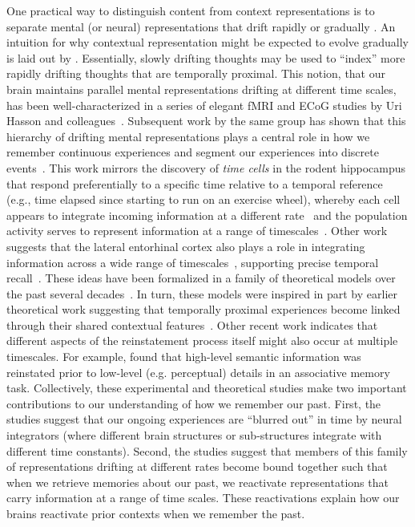 \documentclass{article}
\begin{document}
One practical way to distinguish content from context representations is to separate mental (or neural) representations that drift rapidly \citep[content;][]{PolyEtal05a, MannEtal12} or gradually \citep[context;][]{PolyEtal05a, MannEtal11, HowaEtal12, LohnEtal18, LongKaha18, FolkEtal18}.  An intuition for why contextual representation might be expected to evolve gradually is laid out by \cite{PolyKaha08}.  Essentially, slowly drifting thoughts may be used to ``index'' more rapidly drifting thoughts that are temporally proximal.  This notion, that our brain maintains parallel mental representations drifting at different time scales, has been well-characterized in a series of elegant fMRI and ECoG studies by Uri Hasson and colleagues~\citep{HassEtal08, LernEtal11, HoneEtal12a, AlyEtal18}.  Subsequent work by the same group has shown that this hierarchy of drifting mental representations plays a central role in how we remember continuous experiences and segment our experiences into discrete events~\citep{BaldEtal17}. This work mirrors the discovery of \textit{time cells} in the rodent hippocampus that respond preferentially to a specific time relative to a temporal reference (e.g., time elapsed since starting to run on an exercise wheel), whereby each cell appears to integrate incoming information at a different rate~\citep{PastEtal08, MacDEtal11} and the population activity serves to represent information at a range of timescales~\citep{MauEtal18}. Other work suggests that the lateral entorhinal cortex also plays a role in integrating information across a wide range of timescales~\citep{TsaoEtal18}, supporting precise temporal recall~\citep{MontEtal19}.  These ideas have been formalized in a family of theoretical models over the past several decades~\citep{HowaKaha02a, DianEtal07, SedeEtal08, PolyEtal09, ShanEtal09, ShanHowa10, ShanHowa12, HowaEtal14, Rang18}.  In turn, these models were inspired in part by earlier theoretical work suggesting that temporally proximal experiences become linked through their shared contextual features~\citep{Este55a,AtkiShif68}.  Other recent work indicates that different aspects of the reinstatement process itself might also occur at multiple timescales.  For example, \cite{LindEtal19} found that high-level semantic information was reinstated prior to low-level (e.g. perceptual) details in an associative memory task.  Collectively, these experimental and theoretical studies make two important contributions to our understanding of how we remember our past.  First, the studies suggest that our ongoing experiences are ``blurred out'' in time by neural integrators (where different brain structures or sub-structures integrate with different time constants).  Second, the studies suggest that members of this family of representations drifting at different rates become bound together such that when we retrieve memories about our past, we reactivate representations that carry information at a range of time scales.  These reactivations explain how our brains reactivate prior contexts when we remember the past.
\end{document}
